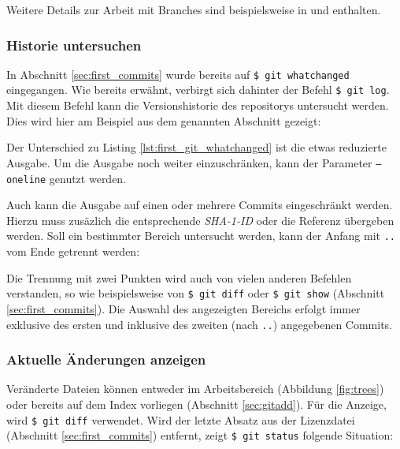 Weitere Details zur Arbeit mit Branches sind beispielsweise in \cite[388-389,
408-415]{cd} und \cite[56-88]{progit} enthalten.

\subsubsection{Historie untersuchen}\label{sec:arch}
In Abschnitt \ref{sec:first_commits} wurde bereits auf \texttt{\$ git
whatchanged} eingegangen. Wie bereits erwähnt, verbirgt sich dahinter der
Befehl \texttt{\$ git log}. Mit diesem Befehl kann die Versionshistorie des
\glspl{repository} untersucht werden. Dies wird hier am Beispiel aus dem
genannten Abschnitt gezeigt:


Der Unterschied zu Listing \ref{lst:first_git_whatchanged} ist die etwas
reduzierte Ausgabe. Um die Ausgabe noch weiter einzuschränken, kann der
Parameter \texttt{--oneline} genutzt werden.


Auch kann die Ausgabe auf einen oder mehrere Commits eingeschränkt werden.
Hierzu muss zusäzlich die entsprechende \textit{SHA-1-ID} oder die
Referenz übergeben werden. Soll ein bestimmter Bereich untersucht werden, kann
der Anfang mit \texttt{..} vom Ende getrennt werden:


Die Trennung mit zwei Punkten wird auch von vielen anderen Befehlen verstanden,
so wie beispielsweise von \texttt{\$ git diff} oder \texttt{\$ git show} (Abschnitt
\ref{sec:first_commits}). Die Auswahl des angezeigten Bereichs erfolgt immer
exklusive des ersten und inklusive des zweiten (nach \texttt{..}) angegebenen
Commits. \cite[45-48]{gitosp}

\subsubsection{Aktuelle Änderungen anzeigen}\label{sec:gitdiff}
Veränderte Dateien können entweder im Arbeitsbereich (Abbildung
\ref{fig:trees}) oder bereits auf dem Index vorliegen (Abschnitt
\ref{sec:gitadd}). Für die Anzeige, wird \texttt{\$ git diff} verwendet.
Wird der letzte Absatz aus der Lizenzdatei (Abschnitt \ref{sec:first_commits})
entfernt, zeigt \texttt{\$ git status} folgende Situation:

